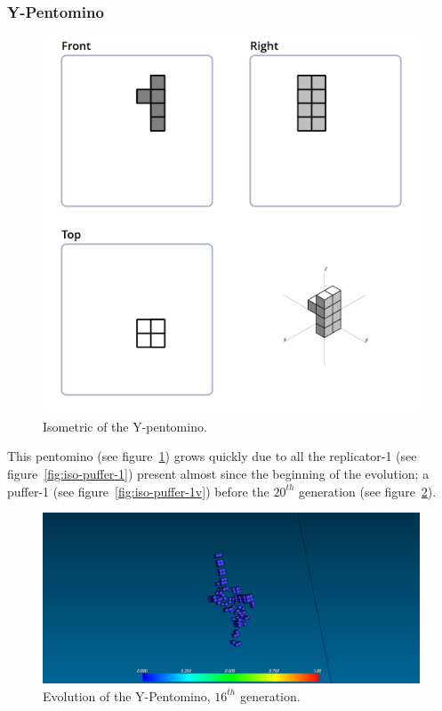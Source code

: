 \subsubsection{Y-Pentomino}
\label{sec:y-pentomino}

\begin{figure}[H]
	\centering
	\includegraphics[scale=0.3]{iso_diagrams/y.png}
	\caption{Isometric of the Y-pentomino.}
	\label{fig:iso-pent-y}
\end{figure}

This pentomino (see figure~\ref{fig:iso-pent-y}) grows quickly due to all the
replicator-1 (see figure~\ref{fig:iso-puffer-1}) present almost since the
beginning of the evolution; a puffer-1 (see figure~\ref{fig:iso-puffer-1v})
before the $20^{th}$ generation (see figure~\ref{fig:ss-pent:y-16}).

\begin{figure}[H]
	\centering
	\includegraphics[scale=0.3]{pentominoes_ss/y_16.png}
	\caption{Evolution of the Y-Pentomino, $16^{th}$ generation.}
	\label{fig:ss-pent:y-16}
\end{figure}

